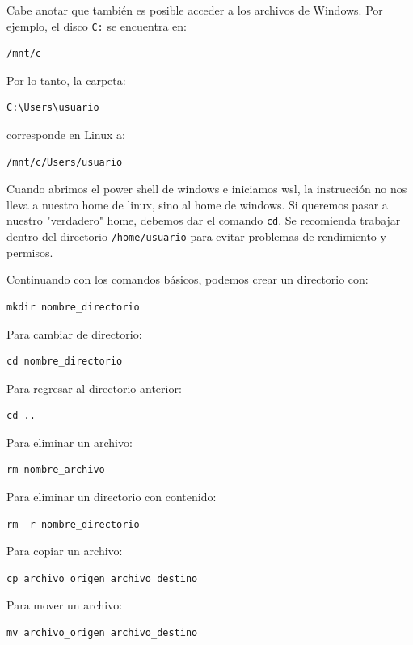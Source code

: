 \documentclass[12pt]{article}
\begin{document}
Cabe anotar que también es posible acceder a los archivos de Windows. 
Por ejemplo, el disco \texttt{C:} se encuentra en:
\begin{lstlisting}
/mnt/c
\end{lstlisting}
Por lo tanto, la carpeta:
\begin{lstlisting}
C:\Users\usuario
\end{lstlisting}
corresponde en Linux a:
\begin{lstlisting}
/mnt/c/Users/usuario
\end{lstlisting}
Cuando abrimos el power shell de windows e iniciamos wsl, la instrucción no nos 
lleva a nuestro home de linux, sino al home de windows.
Si queremos pasar a nuestro "verdadero" home, debemos dar el comando \lstinline|cd|.
Se recomienda trabajar dentro del directorio \texttt{/home/usuario} para evitar problemas 
de rendimiento y permisos.

Continuando con los comandos básicos, podemos crear un directorio con:
\begin{lstlisting}
mkdir nombre_directorio
\end{lstlisting}
Para cambiar de directorio:
\begin{lstlisting}
cd nombre_directorio
\end{lstlisting}
Para regresar al directorio anterior:
\begin{lstlisting}
cd ..
\end{lstlisting}
Para eliminar un archivo:
\begin{lstlisting}
rm nombre_archivo
\end{lstlisting}
Para eliminar un directorio con contenido:
\begin{lstlisting}
rm -r nombre_directorio
\end{lstlisting}
Para copiar un archivo:
\begin{lstlisting}
cp archivo_origen archivo_destino
\end{lstlisting}
Para mover un archivo:
\begin{lstlisting}
mv archivo_origen archivo_destino
\end{lstlisting}    
\end{document}
